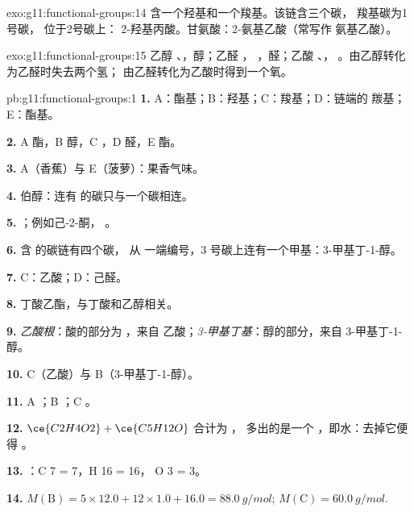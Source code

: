 \begin{solution}{exo:g11:functional-groups:14}
含一个羟基和一个羧基。该链含三个碳，
羧基碳为1号碳， 位于2号碳上：
2-羟基丙酸。甘氨酸：2-氨基乙酸（常写作
氨基乙酸）。
\end{solution}

\begin{solution}{exo:g11:functional-groups:15}
乙醇 、，醇；乙醛 ，
，醛；乙酸 、，
。由乙醇转化为乙醛时失去两个氢；
由乙醛转化为乙酸时得到一个氧。
\end{solution}

\begin{solution}{pb:g11:functional-groups:1}
\textbf{1.} A：酯基；B：羟基；C：羧基；D：链端的
羰基；E：酯基。

\textbf{2.} A 酯，B 醇，C ，D 醛，E 酯。

\textbf{3.} A（香蕉）与 E（菠萝）：果香气味。

\textbf{4.} 伯醇：连有  的碳只与一个碳相连。

\textbf{5.} ；例如己-2-酮，
。

\textbf{6.} 含  的碳链有四个碳，
从  一端编号，3 号碳上连有一个甲基：3-甲基丁-1-醇。

\textbf{7.} C：乙酸；D：己醛。

\textbf{8.} 丁酸乙酯，与丁酸和乙醇相关。

\textbf{9.} \emph{乙酸根}：酸的部分为 ，来自
乙酸；\emph{3-甲基丁基}：醇的部分，来自 3-甲基丁-1-醇。

\textbf{10.} C（乙酸）与 B（3-甲基丁-1-醇）。

\textbf{11.} A ；B ；C 。

\textbf{12.} $\ce{C2H4O2} + \ce{C5H12O}$ 合计为 ，
多出的是一个 ，即水：去掉它便得 。

\textbf{13.} ：C 7 = 7，H 16 = 16，
O 3 = 3。

\textbf{14.} $M(\text{B}) = 5 \times 12.0 + 12 \times 1.0 + 16.0 =
\qty{88.0}{g/mol}$; $M(\text{C}) = \qty{60.0}{g/mol}$.


\end{solution}
